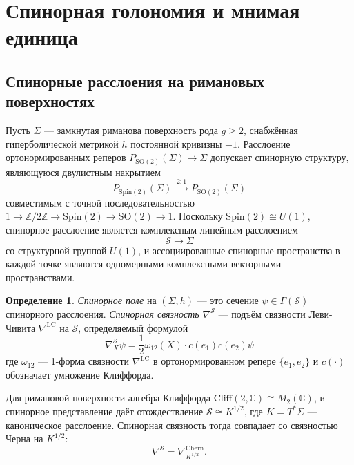 \documentclass[12pt,a4paper]{article}
\theoremstyle{definition}
\newtheorem{definition}[theorem]{Определение}
\theoremstyle{remark}
\newcommand{\CC}{\mathbb{C}}
\newcommand{\ZZ}{\mathbb{Z}}
\newcommand{\SO}{\mathrm{SO}}
\newcommand{\LC}{\mathrm{LC}}
\newcommand{\Chern}{\mathrm{Chern}}
\newcommand{\Spin}{\mathrm{Spin}}
\newcommand{\cS}{\mathcal{S}}
\begin{document}
\section{Спинорная голономия и мнимая единица}
\label{sec:holonomy}

\subsection{Спинорные расслоения на римановых поверхностях}

Пусть $\Sigma$ --- замкнутая риманова поверхность рода $g \geq 2$, снабжённая гиперболической метрикой $h$ постоянной кривизны $-1$. Расслоение ортонормированных реперов $P_{\SO(2)}(\Sigma) \to \Sigma$ допускает спинорную структуру, являющуюся двулистным накрытием
\begin{equation}
P_{\Spin(2)}(\Sigma) \xrightarrow{\; 2:1 \;} P_{\SO(2)}(\Sigma)
\end{equation}
совместимым с точной последовательностью $1 \to \ZZ/2\ZZ \to \Spin(2) \to \SO(2) \to 1$. Поскольку $\Spin(2) \cong U(1)$, спинорное расслоение является комплексным линейным расслоением
\begin{equation}
\cS \to \Sigma
\end{equation}
со структурной группой $U(1)$, и ассоциированные спинорные пространства в каждой точке являются одномерными комплексными векторными пространствами.

\begin{definition}
\emph{Спинорное поле} на $(\Sigma, h)$ --- это сечение $\psi \in \Gamma(\cS)$ спинорного расслоения. \emph{Спинорная связность} $\nabla^{\cS}$ --- подъём связности Леви-Чивита $\nabla^{\LC}$ на $\cS$, определяемый формулой
\begin{equation}
\nabla^{\cS}_X \psi = \frac{1}{2} \omega_{12}(X) \cdot c(e_1) c(e_2) \psi
\end{equation}
где $\omega_{12}$ --- 1-форма связности $\nabla^{\LC}$ в ортонормированном репере $\{e_1, e_2\}$ и $c(\cdot)$ обозначает умножение Клиффорда.
\end{definition}

Для римановой поверхности алгебра Клиффорда $\mathrm{Cliff}(2, \CC) \cong M_2(\CC)$, и спинорное представление даёт отождествление $\cS \cong K^{1/2}$, где $K = T^*\Sigma$ --- каноническое расслоение. Спинорная связность тогда совпадает со связностью Черна на $K^{1/2}$:
\begin{equation}
\nabla^{\cS} = \nabla^{\Chern}_{K^{1/2}}.
\end{equation}
\end{document}
